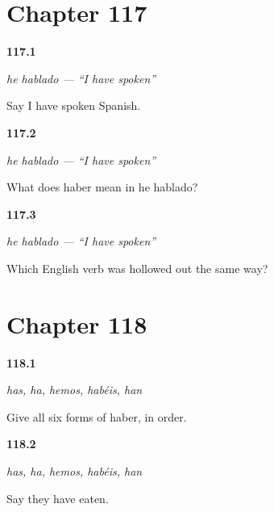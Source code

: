 \section*{Chapter 117}

\noindent\begin{minipage}[t]{\linewidth}
\raggedright
\hypertarget{review-ES-C49-he-hablado-say}{\textbf{117.1}} \emph{he hablado — \textquotedblleft{}I have spoken\textquotedblright{}}\par
\small Say I have spoken Spanish.
\end{minipage}\par\medskip

\noindent\begin{minipage}[t]{\linewidth}
\raggedright
\hypertarget{review-ES-C49-he-hablado-mean}{\textbf{117.2}} \emph{he hablado — \textquotedblleft{}I have spoken\textquotedblright{}}\par
\small What does haber mean in he hablado?
\end{minipage}\par\medskip

\noindent\begin{minipage}[t]{\linewidth}
\raggedright
\hypertarget{review-ES-C49-he-hablado-english}{\textbf{117.3}} \emph{he hablado — \textquotedblleft{}I have spoken\textquotedblright{}}\par
\small Which English verb was hollowed out the same way?
\end{minipage}\par\medskip

\section*{Chapter 118}

\noindent\begin{minipage}[t]{\linewidth}
\raggedright
\hypertarget{review-ES-C49-haber-completo-all}{\textbf{118.1}} \emph{has, ha, hemos, habéis, han}\par
\small Give all six forms of haber, in order.
\end{minipage}\par\medskip

\noindent\begin{minipage}[t]{\linewidth}
\raggedright
\hypertarget{review-ES-C49-haber-completo-they}{\textbf{118.2}} \emph{has, ha, hemos, habéis, han}\par
\small Say they have eaten.
\end{minipage}\par\medskip


